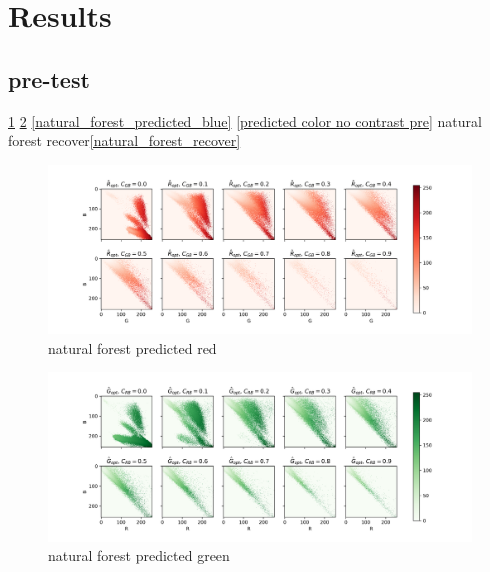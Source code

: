 \documentclass[11pt]{scrartcl} %
\begin{document}
\section{Results}

\subsection{pre-test}

\ref{natural_forest_predicted_red}
\ref{natural_forest_predicted_green}
\ref{natural_forest_predicted_blue}
\ref{predicted color no contrast pre}
natural forest recover\ref{natural_forest_recover}

\begin{figure}[h] %
	\centering
	\includegraphics[width=1\columnwidth]{Figure/natural_forest_predicted_red} %
	\caption{natural forest predicted red}
	\label{natural_forest_predicted_red}
\end{figure}

\begin{figure}[h] %
	\centering
	\includegraphics[width=1\columnwidth]{Figure/natural_forest_predicted_green} %
	\caption{natural forest predicted green}
	\label{natural_forest_predicted_green}
\end{figure}
\end{document}
